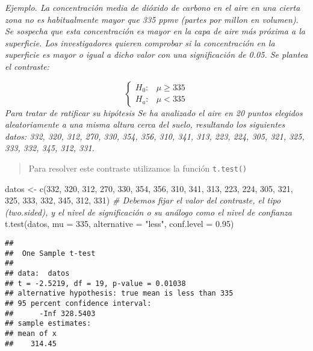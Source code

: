 \documentclass[
]{book}
\newenvironment{Shaded}{\begin{snugshade}}{\end{snugshade}}
\newcommand{\AttributeTok}[1]{\textcolor[rgb]{0.77,0.63,0.00}{#1}}
\newcommand{\CommentTok}[1]{\textcolor[rgb]{0.56,0.35,0.01}{\textit{#1}}}
\newcommand{\DecValTok}[1]{\textcolor[rgb]{0.00,0.00,0.81}{#1}}
\newcommand{\FloatTok}[1]{\textcolor[rgb]{0.00,0.00,0.81}{#1}}
\newcommand{\FunctionTok}[1]{\textcolor[rgb]{0.00,0.00,0.00}{#1}}
\newcommand{\NormalTok}[1]{#1}
\newcommand{\OtherTok}[1]{\textcolor[rgb]{0.56,0.35,0.01}{#1}}
\newcommand{\StringTok}[1]{\textcolor[rgb]{0.31,0.60,0.02}{#1}}
\begin{document}
\emph{Ejemplo. La concentración media de dióxido de carbono en el aire en una cierta zona no es habitualmente mayor que 335 ppmv (partes por millon en volumen). Se sospecha que esta concentración es mayor en la capa de aire más próxima a la superficie. Los investigadores quieren comprobar si la concentración en la superficie es mayor o igual a dicho valor con una significación de 0.05. Se plantea el contraste:}

\[\left\{\begin{array}{ll} H_0: & \mu \geq 335\\ H_a: & \mu < 335 \end{array}\right.\] \emph{Para tratar de ratificar su hipótesis Se ha analizado el aire en 20 puntos elegidos aleatoriamente a una misma altura cerca del suelo, resultando los siguientes datos: 332, 320, 312, 270, 330, 354, 356, 310, 341, 313, 223, 224, 305, 321, 325, 333, 332, 345, 312, 331.}

\begin{quote}
Para resolver este contraste utilizamos la función \texttt{t.test()}
\end{quote}

\begin{Shaded}
\begin{Highlighting}[]
\NormalTok{datos }\OtherTok{\textless{}{-}} \FunctionTok{c}\NormalTok{(}\DecValTok{332}\NormalTok{, }\DecValTok{320}\NormalTok{, }\DecValTok{312}\NormalTok{, }\DecValTok{270}\NormalTok{, }\DecValTok{330}\NormalTok{, }\DecValTok{354}\NormalTok{, }\DecValTok{356}\NormalTok{, }\DecValTok{310}\NormalTok{, }\DecValTok{341}\NormalTok{, }\DecValTok{313}\NormalTok{, }\DecValTok{223}\NormalTok{, }\DecValTok{224}\NormalTok{, }\DecValTok{305}\NormalTok{, }\DecValTok{321}\NormalTok{, }\DecValTok{325}\NormalTok{, }\DecValTok{333}\NormalTok{, }\DecValTok{332}\NormalTok{, }\DecValTok{345}\NormalTok{, }\DecValTok{312}\NormalTok{, }\DecValTok{331}\NormalTok{)}
\CommentTok{\# Debemos fijar el valor del contraste, el tipo (two.sided), y el nivel de significación o su análogo como el nivel de confianza}
\FunctionTok{t.test}\NormalTok{(datos, }\AttributeTok{mu =} \DecValTok{335}\NormalTok{, }\AttributeTok{alternative =} \StringTok{"less"}\NormalTok{, }\AttributeTok{conf.level =} \FloatTok{0.95}\NormalTok{)}
\end{Highlighting}
\end{Shaded}

\begin{verbatim}
## 
##  One Sample t-test
## 
## data:  datos
## t = -2.5219, df = 19, p-value = 0.01038
## alternative hypothesis: true mean is less than 335
## 95 percent confidence interval:
##      -Inf 328.5403
## sample estimates:
## mean of x 
##    314.45
\end{verbatim}
\end{document}
